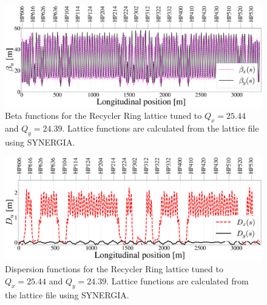 \begin{figure}[H]
   \centering
   \includegraphics[width=\columnwidth]{chapter3/betas.png}
   \caption{Beta functions for the Recycler Ring lattice tuned to $Q_x=25.44$ and $Q_y=24.39$. Lattice functions are calculated from the lattice file using SYNERGIA.}
   \label{fig:rrbetas}
\end{figure}

\begin{figure}[H]
   \centering
   \includegraphics[width=\columnwidth]{chapter3/disps.png}
   \caption{Dispersion functions for the Recycler Ring lattice tuned to $Q_x=25.44$ and $Q_y=24.39$. Lattice functions are calculated from the lattice file using SYNERGIA.}
   \label{fig:rrdisps}
\end{figure}

